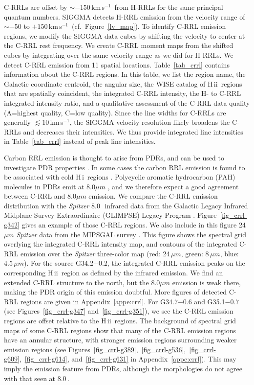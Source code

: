 \documentclass[manuscript]{aastex61}
\newcommand{\hii}{{\rm H\,}{{\sc ii}}}
\newcommand{\hi}{{\rm H\,}{{\sc i}}}
\newcommand{\kms}{\,km\,s$^{-1}$}
\newcommand{\um}{\mu m}
\begin{document}
C-RRLs are offset by $\sim-150$\kms\ from H-RRLs for the same principal quantum numbers.
SIGGMA detects H-RRL emission from the velocity range of $\sim-50$ to $+150$\kms\ (cf.~Figure~\ref{lv_map}).
To identify C-RRL emission regions, we modify the SIGGMA data cubes by shifting the velocity to center at the C-RRL rest frequency.
We create C-RRL moment maps from the shifted cubes by integrating over the same velocity range as we did for H-RRLs. We detect C-RRL emission from 11 spatial locations.
Table~\ref{tab_crrl} contains information about the C-RRL regions. 
In this table, we list the region name, the Galactic coordinate centroid, the angular size, the WISE catalog of \hii\ regions that are spatially coincident, the integrated C-RRL intensity, the H- to C-RRL integrated intensity ratio, and a qualitative assessment of the C-RRL data quality (A=highest quality, C=low quality).
Since the line widths for C-RRLs are generally $\lesssim10$\kms, the SIGGMA velocity resolution likely broadens the C-RRLs and decreases their intensities.  We thus provide integrated line intensities in Table~\ref{tab_crrl} instead of peak line intensities.

Carbon RRL emission is thought to arise from PDRs, and can be used to investigate PDR properties \citep[][etc.]{Pankonin1977,Natta1994,Roshi2007}.
In some cases the carbon RRL emission is found to be associated with cold \hi\ regions \citep{Roshi2011}.
Polycyclic aromatic hydrocarbon (PAH) molecules in PDRs emit at 8.0$\um$ \citep{Watson2008,Watson2009}, and we therefore expect a good agreement between C-RRL and 8.0$\um$ emission.
We compare the C-RRL emission distribution with the {\it Spitzer} 8.0\,\micron\ infrared data from the Galactic Legacy Infrared Midplane Survey Extraordinaire (GLIMPSE) Legacy Program \citep{Benjamin2003,Churchwell2009}.
Figure~\ref{fig_crrl-g342} gives an example of those C-RRL regions.
We also include in this figure 24$\um$ {\it Spitzer} data from the MIPSGAL survey \citep{Carey2009, Gutermuth2015}.
This figure shows the spectral grid overlying the integrated C-RRL intensity map, and contours of the integrated C-RRL emission over the {\it Spitzer} three-color map (red: 24\,$\um$, green: 8\,$\um$, blue: 4.5\,$\um$).
For the source G34.2$+$0.2, the integrated C-RRL emission peaks on the corresponding \hii\ region as defined by the infrared emission.
We find an extended C-RRL structure to the north, but the 8.0$\um$ emission is weak there, making the PDR origin of this emission doubtful.
More figures of detected C-RRL regions are given in Appendix~\ref{appe:crrl}.
For G34.7$-$0.6 and G35.1$-$0.7 (see Figures~\ref{fig_crrl-g347} and~\ref{fig_crrl-g351}), we see the C-RRL emission regions are offset relative to the \hii\ regions.
The background of spectral grid maps of some C-RRL regions show that many of the C-RRL emission regions have an annular structure, with stronger emission regions surrounding weaker emission regions (see Figures~\ref{fig_crrl-g389},~\ref{fig_crrl-g536},~\ref{fig_crrl-g609},~\ref{fig_crrl-g614}, and~\ref{fig_crrl-g631} in Appendix~\ref{appe:crrl}).
This may imply the emission feature from PDRs, although the morphologies do not agree with that seen at 8.0\,\micron.
\end{document}
